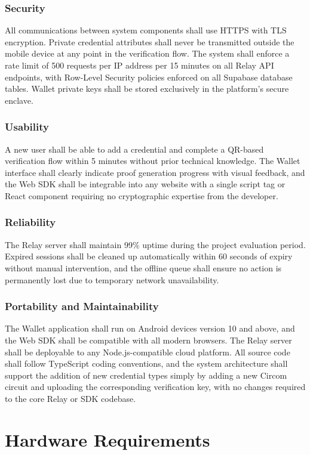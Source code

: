\subsubsection{Security}
All communications between system components shall use HTTPS with TLS encryption. Private credential attributes shall never be transmitted outside the mobile device at any point in the verification flow. The system shall enforce a rate limit of 500 requests per IP address per 15 minutes on all Relay API endpoints, with Row-Level Security policies enforced on all Supabase database tables. Wallet private keys shall be stored exclusively in the platform's secure enclave.

\subsubsection{Usability}
A new user shall be able to add a credential and complete a QR-based verification flow within 5 minutes without prior technical knowledge. The Wallet interface shall clearly indicate proof generation progress with visual feedback, and the Web SDK shall be integrable into any website with a single script tag or React component requiring no cryptographic expertise from the developer.

\subsubsection{Reliability}
The Relay server shall maintain 99\% uptime during the project evaluation period. Expired sessions shall be cleaned up automatically within 60 seconds of expiry without manual intervention, and the offline queue shall ensure no action is permanently lost due to temporary network unavailability.

\subsubsection{Portability and Maintainability}
The Wallet application shall run on Android devices version 10 and above, and the Web SDK shall be compatible with all modern browsers. The Relay server shall be deployable to any Node.js-compatible cloud platform. All source code shall follow TypeScript coding conventions, and the system architecture shall support the addition of new credential types simply by adding a new Circom circuit and uploading the corresponding verification key, with no changes required to the core Relay or SDK codebase.

\section{Hardware Requirements}

